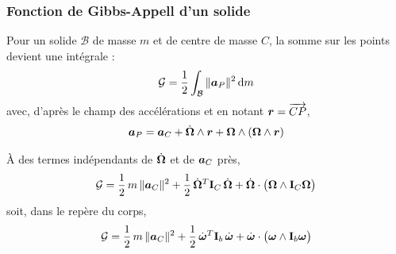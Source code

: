 \subsubsection{Fonction de Gibbs-Appell d'un solide}

Pour un solide $\mathcal{B}$ de masse $m$ et de centre de masse $C$,
la somme sur les points devient une intégrale :
\[
    \mathcal{G} = \frac{1}{2}\int_{\mathcal{B}}\|\bm{a}_P\|^2\,\mathrm{d} m
\]
avec, d'après le champ des accélérations et en notant
$\bm{r} = \overrightarrow{CP}$,
\[
    \bm{a}_P = \bm{a}_C + \dot{\bm{\Omega}}\wedge\bm{r}
    + \bm{\Omega}\wedge(\bm{\Omega}\wedge\bm{r})
\]

\begin{proposition}
    À des termes indépendants de $\dot{\bm{\Omega}}$ et de
    $\bm{a}_C$ près,
    \[
        \mathcal{G} = \frac{1}{2}\,m\,\|\bm{a}_C\|^2
        + \frac{1}{2}\,\dot{\bm{\Omega}}^T\mathbf{I}_C\,\dot{\bm{\Omega}}
        + \dot{\bm{\Omega}}\cdot\bigl(\bm{\Omega}\wedge
        \mathbf{I}_C\bm{\Omega}\bigr)
    \]
    soit, dans le repère du corps,
    \[
        \mathcal{G} = \frac{1}{2}\,m\,\|\bm{a}_C\|^2
        + \frac{1}{2}\,\dot{\bm{\omega}}^T\mathbf{I}_b\,\dot{\bm{\omega}}
        + \dot{\bm{\omega}}\cdot\bigl(\bm{\omega}\wedge
        \mathbf{I}_b\bm{\omega}\bigr)
    \]
\end{proposition}

